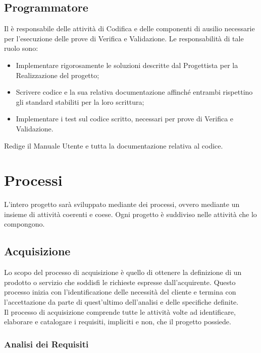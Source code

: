 \subsection{Programmatore}

Il  è responsabile delle attivit\`{a} di Codifica e delle componenti di ausilio
necessarie per l'esecuzione delle prove di Verifica e Validazione. Le responsabilità di tale ruolo sono:
\begin{itemize}
\item Implementare rigorosamente le soluzioni descritte dal Progettista per la Realizzazione del progetto;
\item Scrivere codice e la sua relativa documentazione affinché entrambi rispettino gli standard stabiliti per la loro scrittura;
\item Implementare i test sul codice scritto, necessari per prove di Verifica e Validazione.
\end{itemize}
Redige il Manuale Utente e tutta la documentazione relativa al codice.

\newpage
\section{Processi}
L'intero progetto sarà sviluppato mediante dei processi, ovvero mediante un insieme di attivit\`{a} coerenti e coese.
Ogni progetto è suddiviso nelle attivit\`{a} che lo compongono.


\subsection{Acquisizione}
\label{processo_analisi}

Lo scopo del processo di acquisizione è quello di ottenere la definizione di un prodotto o servizio che soddisfi le richieste espresse dall'acquirente.
Questo processo inizia con l'identificazione delle necessità del cliente e termina con l'accettazione da parte di quest'ultimo dell'analisi e delle specifiche definite.\\
Il processo di acquisizione comprende tutte le attivit\`{a} volte ad identificare, elaborare e catalogare i requisiti, impliciti e non, che il progetto possiede.

\subsubsection{Analisi dei Requisiti}
